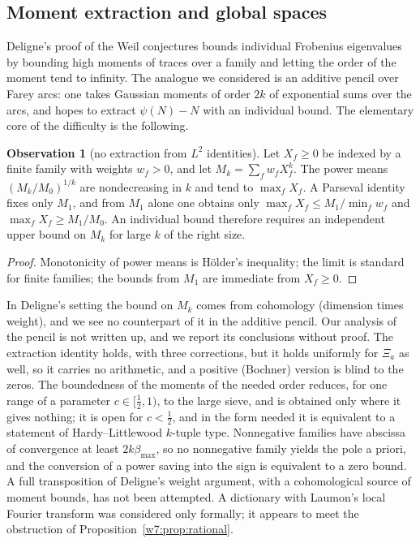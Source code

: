 \documentclass[11pt]{amsart}
\theoremstyle{definition}
\newtheorem{observation}[theorem]{Observation}
\theoremstyle{remark}
\numberwithin{equation}{section}
\begin{document}
\subsection{Moment extraction and global spaces}\label{w7:fam:R22}

Deligne's proof of the Weil conjectures \cite{Deligne1974} bounds individual Frobenius eigenvalues by bounding
high moments of traces over a family and letting the order of the moment tend to infinity. The analogue we
considered is an additive pencil over Farey arcs: one takes Gaussian moments of order $2k$ of exponential sums
over the arcs, and hopes to extract $\psi(N)-N$ with an individual bound. The elementary core of the difficulty
is the following.

\begin{observation}[no extraction from $L^2$ identities]\label{w7:obs:L2}
Let $X_f\ge0$ be indexed by a finite family with weights $w_f>0$, and let $M_k=\sum_fw_fX_f^k$. The power means
$(M_k/M_0)^{1/k}$ are nondecreasing in $k$ and tend to $\max_fX_f$. A Parseval identity fixes only $M_1$, and
from $M_1$ alone one obtains only $\max_fX_f\le M_1/\min_fw_f$ and $\max_fX_f\ge M_1/M_0$. An individual bound
therefore requires an independent upper bound on $M_k$ for large $k$ of the right size.
\end{observation}

\begin{proof}
Monotonicity of power means is H\"older's inequality; the limit is standard for finite families; the bounds
from $M_1$ are immediate from $X_f\ge0$.
\end{proof}

In Deligne's setting the bound on $M_k$ comes from cohomology (dimension times weight), and we see no counterpart
of it in the additive pencil. Our analysis of the pencil is not written up, and we report its conclusions without
proof. The extraction identity holds, with three corrections, but it holds uniformly for $\Xi_a$ as well, so it
carries no arithmetic, and a positive (Bochner) version is blind to the zeros. The boundedness of the moments of
the needed order reduces, for one range of a parameter $c\in[\frac12,1)$, to the large sieve, and is obtained
only where it gives nothing; it is open for $c<\frac12$, and in the form needed it is equivalent to a statement
of Hardy--Littlewood $k$-tuple type. Nonnegative families have abscissa of convergence at least
$2k\beta_{\max}$, so no nonnegative family yields the pole a priori, and the conversion of a power saving into
the sign is equivalent to a zero bound. A full transposition of Deligne's weight argument, with a cohomological
source of moment bounds, has not been attempted. A dictionary with Laumon's local Fourier transform
\cite{Laumon1987} was considered only formally; it appears to meet the obstruction of
Proposition~\ref{w7:prop:rational}.
\end{document}
